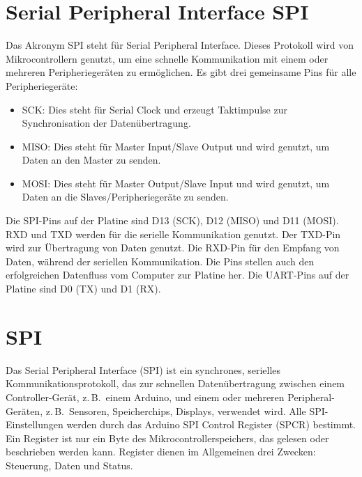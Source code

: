 %
%
%

\chapter{Serial Peripheral Interface SPI}\label{SPI}

Das Akronym SPI steht für Serial Peripheral Interface. Dieses Protokoll wird von Mikrocontrollern genutzt, um eine schnelle Kommunikation mit einem oder mehreren Peripheriegeräten zu ermöglichen. Es gibt drei gemeinsame Pins für alle Peripheriegeräte:

\begin{itemize}
  \item SCK: Dies steht für Serial Clock und erzeugt Taktimpulse zur Synchronisation der Datenübertragung.
  \item MISO: Dies steht für Master Input/Slave Output und wird genutzt, um Daten an den Master zu senden.
  \item MOSI: Dies steht für Master Output/Slave Input und wird genutzt, um Daten an die Slaves/Peripheriegeräte zu senden.
\end{itemize}


Die SPI-Pins auf der Platine sind D13 (SCK), D12 (MISO) und D11 (MOSI). RXD und TXD werden für die serielle Kommunikation genutzt.
Der TXD-Pin wird zur Übertragung von Daten genutzt. Die RXD-Pin für den Empfang von Daten, während der seriellen Kommunikation. Die Pins stellen auch den erfolgreichen Datenfluss vom Computer zur Platine her. Die UART-Pins auf der Platine sind D0 (TX) und D1 (RX).

\chapter{SPI}

Das Serial Peripheral Interface (SPI) ist ein synchrones, serielles Kommunikationsprotokoll, das zur schnellen Datenübertragung zwischen einem Controller-Gerät, z.\,B.\ einem Arduino, und einem oder mehreren Peripheral-Geräten, z.\,B.\ Sensoren, Speicherchips, Displays, verwendet wird. Alle SPI-Einstellungen werden durch das Arduino SPI Control Register (SPCR) bestimmt. Ein Register ist nur ein Byte des Mikrocontrollerspeichers, das gelesen oder beschrieben werden kann. Register dienen im Allgemeinen drei Zwecken: Steuerung, Daten und Status.  \cite{Arduino:2024SPI} \cite{Arduino:2022SPI}

